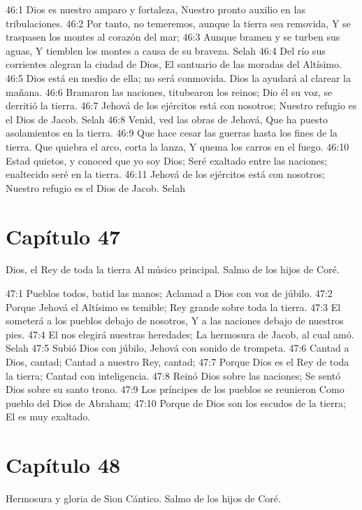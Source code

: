 46:1 Dios es nuestro amparo y fortaleza, 
Nuestro pronto auxilio en las tribulaciones. 
46:2 Por tanto, no temeremos, aunque la tierra sea removida, 
Y se traspasen los montes al corazón del mar; 
46:3 Aunque bramen y se turben sus aguas, 
Y tiemblen los montes a causa de su braveza. Selah 
46:4 Del río sus corrientes alegran la ciudad de Dios, 
El santuario de las moradas del Altísimo. 
46:5 Dios está en medio de ella; no será conmovida. 
Dios la ayudará al clarear la mañana. 
46:6 Bramaron las naciones, titubearon los reinos; 
Dio él su voz, se derritió la tierra. 
46:7 Jehová de los ejércitos está con nosotros; 
Nuestro refugio es el Dios de Jacob. Selah 
46:8 Venid, ved las obras de Jehová, 
Que ha puesto asolamientos en la tierra. 
46:9 Que hace cesar las guerras hasta los fines de la tierra. 
Que quiebra el arco, corta la lanza, 
Y quema los carros en el fuego. 
46:10 Estad quietos, y conoced que yo soy Dios; 
Seré exaltado entre las naciones; enaltecido seré en la tierra. 
46:11 Jehová de los ejércitos está con nosotros; 
Nuestro refugio es el Dios de Jacob. Selah 
\section*{Capítulo 47}
Dios, el Rey de toda la tierra 
Al músico principal. Salmo de los hijos de Coré. 
 
47:1 Pueblos todos, batid las manos; 
Aclamad a Dios con voz de júbilo. 
47:2 Porque Jehová el Altísimo es temible; 
Rey grande sobre toda la tierra. 
47:3 El someterá a los pueblos debajo de nosotros, 
Y a las naciones debajo de nuestros pies. 
47:4 El nos elegirá nuestras heredades; 
La hermosura de Jacob, al cual amó. Selah 
47:5 Subió Dios con júbilo, 
Jehová con sonido de trompeta. 
47:6 Cantad a Dios, cantad; 
Cantad a nuestro Rey, cantad; 
47:7 Porque Dios es el Rey de toda la tierra; 
Cantad con inteligencia. 
47:8 Reinó Dios sobre las naciones; 
Se sentó Dios sobre su santo trono. 
47:9 Los príncipes de los pueblos se reunieron 
Como pueblo del Dios de Abraham; 
47:10 Porque de Dios son los escudos de la tierra; 
El es muy exaltado. 
\section*{Capítulo 48}
Hermosura y gloria de Sion 
Cántico. Salmo de los hijos de Coré. 
 
